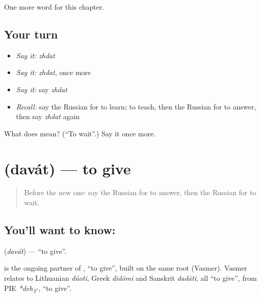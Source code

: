 \begin{grammarlens}[title={What you've built}]
One more word for this chapter.
\end{grammarlens}

\subsection*{Your turn}
\begin{itemize}
\raggedright
  \item \emph{Say it:} \emph{zhdat}
  \item \emph{Say it:} \emph{zhdat}, once more
  \item \emph{Say it:} say \emph{zhdat}
  \item \emph{Recall:} say the Russian for to learn; to teach, then the Russian for to answer, then say \emph{zhdat} again
\end{itemize}

\begin{tcolorbox}[breakable,colback=teal!4,colframe=teal!35!black,title={Before you move on}]
What does  mean? (\textquotedblleft{}To wait\textquotedblright{}.) Say it once more.
\end{tcolorbox}
\section[\texorpdfstring{\ru{давать} (davát)}{давать (davát)}]{ (davát) — to give}

\label{lesson:RU-C41-davat}



\begin{quote}
Before the new one: say the Russian for to answer, then the Russian for to wait.
\end{quote}

\subsection*{You'll want to know: }
\textbf{} (\emph{davát}) — \textquotedblleft{}to give\textquotedblright{}.

\begin{cousinweb}
\textbf{} is the ongoing partner of \emph{}, \textquotedblleft{}to give\textquotedblright{}, built on the same root (Vasmer). Vasmer relates \emph{} to Lithuanian \emph{dúoti}, Greek \emph{didōmi} and Sanskrit \emph{dadāti}, all \textquotedblleft{}to give\textquotedblright{}, from PIE \emph{*deh\textsubscript{3}-}, \textquotedblleft{}to give\textquotedblright{}.
\end{cousinweb}

